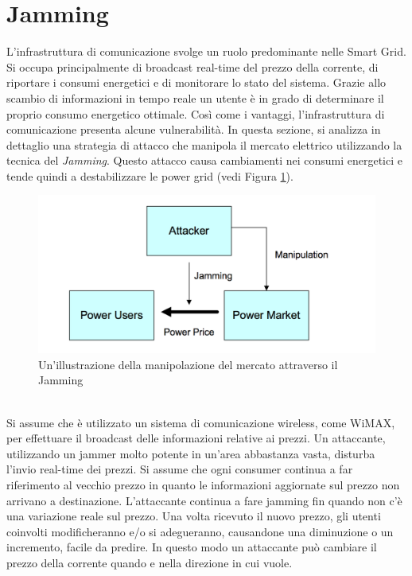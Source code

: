\section{Jamming}
L'infrastruttura di comunicazione svolge un ruolo predominante nelle Smart Grid. Si occupa principalmente di broadcast real-time del prezzo della corrente, di riportare i consumi energetici e di monitorare lo stato del sistema. Grazie allo scambio di informazioni in tempo reale un utente è in grado di determinare il proprio consumo energetico ottimale.\newline
Così come i vantaggi, l'infrastruttura di comunicazione presenta alcune vulnerabilità. In questa sezione, si analizza in dettaglio una strategia di attacco che manipola il mercato elettrico utilizzando la tecnica del \emph{Jamming}. Questo attacco causa cambiamenti nei consumi energetici e tende quindi a destabilizzare le power grid (vedi Figura \ref{fig:jm}). 
\begin{figure}[h]
	\centering
	\includegraphics[scale=0.320]{imgs/attack/jm.png}
	\caption{Un'illustrazione della manipolazione del mercato attraverso il Jamming} \label{fig:jm}
\end{figure}\\
Si assume che è utilizzato un sistema di comunicazione wireless, come WiMAX, per effettuare il broadcast delle informazioni relative ai prezzi. Un attaccante, utilizzando un jammer molto potente in un'area abbastanza vasta, disturba l'invio real-time dei prezzi. Si assume che ogni consumer continua a far riferimento al vecchio prezzo in quanto le informazioni aggiornate sul prezzo non arrivano a destinazione. L'attaccante continua a fare jamming fin quando non c'è una variazione reale sul prezzo. Una volta ricevuto il nuovo prezzo, gli utenti coinvolti modificheranno e/o si adegueranno, causandone una diminuzione o un incremento, facile da predire. In questo modo un attaccante può cambiare il prezzo della corrente quando e nella direzione in cui vuole.
